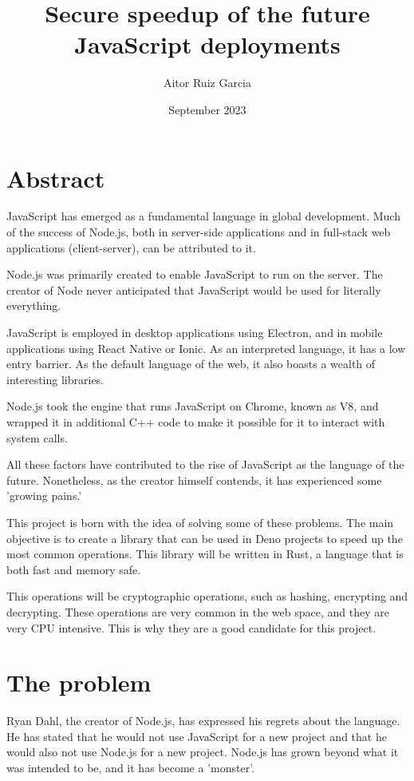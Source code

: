 \documentclass[12pt, letterpaper]{article}
\title{Secure speedup of the future JavaScript deployments}
\author{Aitor Ruiz Garcia}
\date{September 2023}
\begin{document}
\maketitle
\begin{multicols}{2}
    \section{Abstract}
    JavaScript has emerged as a fundamental language in global development. Much of the success of Node.js, both in server-side applications and in full-stack web applications (client-server), can be attributed to it.

    Node.js was primarily created to enable JavaScript to run on the server. The creator of Node never anticipated that JavaScript would be used for literally everything.

    JavaScript is employed in desktop applications using Electron, and in mobile applications using React Native or Ionic. As an interpreted language, it has a low entry barrier. As the default language of the web, it also boasts a wealth of interesting libraries.

    Node.js took the engine that runs JavaScript on Chrome, known as V8, and wrapped it in additional C++ code to make it possible for it to interact with system calls.

    All these factors have contributed to the rise of JavaScript as the language of the future. Nonetheless, as the creator himself contends, it has experienced some 'growing pains.'

    This project is born with the idea of solving some of these problems. The main objective is to create a library that can be used in Deno projects to speed up the most common operations. This library will be written in Rust, a language that is both fast and memory safe.

    This operations will be cryptographic operations, such as hashing, encrypting and decrypting. These operations are very common in the web space, and they are very CPU intensive. This is why they are a good candidate for this project.

    \section{The problem}

    Ryan Dahl, the creator of Node.js, has expressed his regrets about the language. He has stated that he would not use JavaScript for a new project and that he would also not use Node.js for a new project. Node.js has grown beyond what it was intended to be, and it has become a 'monster'.


\end{multicols}
\end{document}
